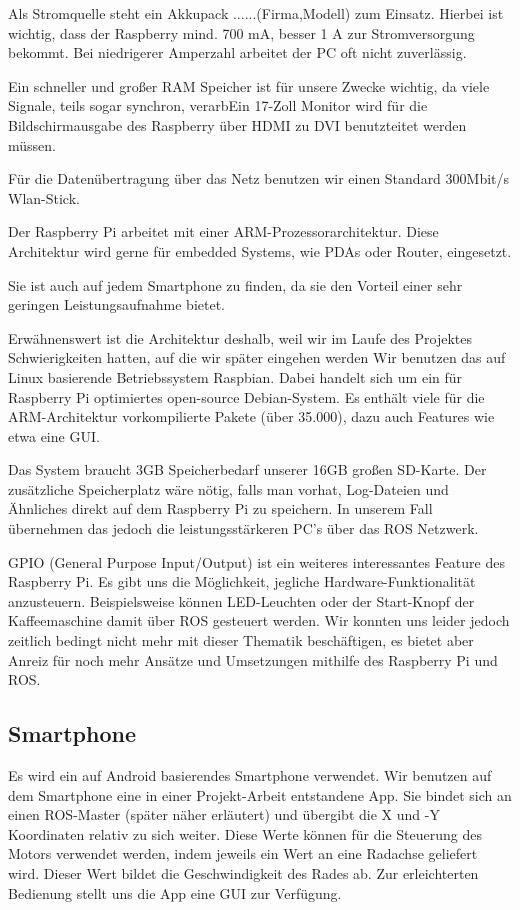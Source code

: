 \documentclass[12pt]{article}
\begin{document}
Als Stromquelle steht ein Akkupack ......(Firma,Modell) zum Einsatz. 
Hierbei ist wichtig, dass der Raspberry mind. 700 mA, besser 1 A zur Stromversorgung bekommt. 
Bei niedrigerer Amperzahl arbeitet der PC oft nicht zuverlässig.

Ein schneller und großer RAM Speicher ist für unsere Zwecke wichtig, da viele Signale, teils sogar synchron, verarbEin 17-Zoll Monitor wird für die Bildschirmausgabe des Raspberry über HDMI zu DVI benutzteitet werden müssen.

Für die Datenübertragung über das Netz benutzen wir einen Standard 300Mbit/s Wlan-Stick.

Der Raspberry Pi arbeitet mit einer ARM-Prozessorarchitektur.
Diese Architektur wird gerne für embedded Systems, wie PDAs oder Router, eingesetzt.

Sie ist auch auf jedem Smartphone zu finden, da sie den Vorteil einer sehr geringen Leistungsaufnahme bietet. 

Erwähnenswert ist die Architektur deshalb, weil wir im Laufe des Projektes Schwierigkeiten hatten, auf die wir später eingehen werden
Wir benutzen das auf Linux basierende Betriebssystem Raspbian.
Dabei handelt sich um ein für Raspberry Pi optimiertes open-source Debian-System.
Es enthält viele für die ARM-Architektur vorkompilierte Pakete (über 35.000), dazu auch Features wie etwa eine GUI.

Das System braucht 3GB Speicherbedarf unserer 16GB großen SD-Karte.
Der zusätzliche Speicherplatz wäre nötig, falls man vorhat, Log-Dateien und Ähnliches direkt auf dem Raspberry Pi zu speichern. 
In unserem Fall übernehmen das jedoch die leistungsstärkeren PC's über das ROS Netzwerk.

GPIO (General Purpose Input/Output) ist ein weiteres interessantes Feature des Raspberry Pi.
Es gibt uns die Möglichkeit, jegliche Hardware-Funktionalität anzusteuern.
Beispielsweise können LED-Leuchten oder der Start-Knopf der Kaffeemaschine damit über ROS gesteuert werden.
Wir konnten uns leider jedoch zeitlich bedingt nicht mehr mit dieser Thematik beschäftigen, es bietet aber Anreiz für noch mehr Ansätze und Umsetzungen mithilfe des Raspberry Pi und ROS.


\subsection{Smartphone}

Es wird ein auf Android basierendes Smartphone verwendet.
Wir benutzen auf dem Smartphone eine in einer Projekt-Arbeit entstandene App.
Sie bindet sich an einen ROS-Master (später näher erläutert) und übergibt die X und -Y Koordinaten relativ zu sich weiter.
Diese Werte können für die Steuerung des Motors verwendet werden, indem jeweils ein Wert an eine Radachse geliefert wird. Dieser Wert bildet die Geschwindigkeit des Rades ab.
Zur erleichterten Bedienung stellt uns die App eine GUI zur Verfügung. 
\end{document}
